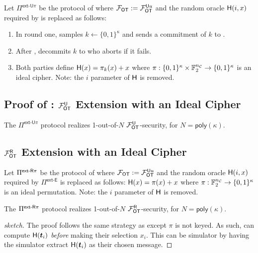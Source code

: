 

\begin{definition}\label{def:ext_U_U}
	Let $\Pi^{\textsf{ext-U}\pi}$ be the protocol of  where $\mathcal{F}_{\mathsf{OT}}:=\mathcal{F}_{\mathsf{OT}}^{\mathsf{U} u}$ and the random oracle $\mathsf{H}(i,x)$ required by  is replaced as follows:
	\begin{enumerate}
		\item In round one, \send samples $k\gets\{0,1\}^{\kappa}$ and sends a commitment of $k$ to \rec.
		\item After , \send decommits $k$ to \rec who aborts if it fails.
		\item Both parties define $\mathsf{H}(x)=\pi_k(x)+x$ where $\pi:\{0,1\}^{\kappa} \times \mathbb{F}^{{n_\mathcal{C}}}_2 \rightarrow\{0,1\}^\kappa$ is an ideal cipher. Note: the $i$ parameter of $\mathsf{H}$ is removed.
	\end{enumerate}
\end{definition}

\subsection{Proof of :  $\mathcal{F}_{\mathsf{OT}}^\mathsf{U}$ Extension with an Ideal Cipher}
\begin{lemma}\label{lem:ext_U_U}
	The $\Pi^{\textsf{ext-U}\pi}$ protocol realizes 1-out-of-$N$ $\mathcal{F}_{\mathsf{OT}}^\mathsf{U}$-security, for $N=\textsf{poly}(\kappa)$.
\end{lemma}





\subsection{ $\mathcal{F}_{\mathsf{OT}}^\mathsf{R}$ Extension with an Ideal Cipher}

\begin{definition}\label{def:ext_S_R}
	Let $\Pi^{\textsf{ext-\ensuremath{\mathsf{R}}}\pi}$ be the protocol of  where $\mathcal{F}_{\mathsf{OT}}:=\mathcal{F}_{\mathsf{OT}}^{\mathsf{U} u}$ and the random oracle $\mathsf{H}(i,x)$ required by $\Pi^{\textsf{ext-E}}$ is replaced as follows: $\mathsf{H}(x)=\pi(x)+x$ where $\pi: \mathbb{F}^{{n_\mathcal{C}}}_2 \rightarrow\{0,1\}^\kappa$ is an ideal permutation. Note: the $i$ parameter of $\mathsf{H}$ is removed.
\end{definition}
\begin{lemma}\label{lem:ext_S_R}
	The $\Pi^{\textsf{ext-\ensuremath{\mathsf{R}}}\pi}$ protocol realizes 1-out-of-$N$ $\mathcal{F}_{\mathsf{OT}}^\mathsf{R}$-security, for $N=\textsf{poly}(\kappa)$.
\end{lemma}
\begin{proof}[sketch]
	The proof follows the same strategy as  except $\pi$ is not keyed. As such, \rec can compute $\mathsf{H}(\boldsymbol{t}_i)$ \emph{before} making their selection $x_i$. This can be simulator by having the simulator extract $\mathsf{H}(\boldsymbol{t}_i)$ as their chosen message. 
\end{proof}

\fi